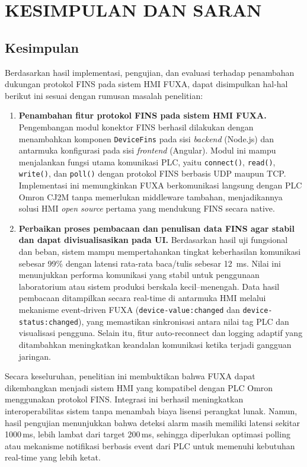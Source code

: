 \chapter{KESIMPULAN DAN SARAN}

\section{Kesimpulan}
Berdasarkan hasil implementasi, pengujian, dan evaluasi terhadap penambahan dukungan protokol FINS pada sistem HMI FUXA, dapat disimpulkan hal-hal berikut ini sesuai dengan rumusan masalah penelitian:

\begin{enumerate}
    \item \textbf{Penambahan fitur protokol FINS pada sistem HMI FUXA.}  
    Pengembangan modul konektor FINS berhasil dilakukan dengan menambahkan komponen \texttt{DeviceFins} pada sisi \textit{backend} (Node.js) dan antarmuka konfigurasi pada sisi \textit{frontend} (Angular).  
    Modul ini mampu menjalankan fungsi utama komunikasi PLC, yaitu \texttt{connect()}, \texttt{read()}, \texttt{write()}, dan \texttt{poll()} dengan protokol FINS berbasis UDP maupun TCP.  
    Implementasi ini memungkinkan FUXA berkomunikasi langsung dengan PLC Omron CJ2M tanpa memerlukan middleware tambahan, menjadikannya solusi HMI \textit{open source} pertama yang mendukung FINS secara native.

    \item \textbf{Perbaikan proses pembacaan dan penulisan data FINS agar stabil dan dapat divisualisasikan pada UI.}  
    Berdasarkan hasil uji fungsional dan beban, sistem mampu mempertahankan tingkat keberhasilan komunikasi sebesar 99\% dengan latensi rata-rata baca/tulis sebesar 12
    \,ms.  
    Nilai ini menunjukkan performa komunikasi yang stabil untuk penggunaan laboratorium atau sistem produksi berskala kecil–menengah.  
    Data hasil pembacaan ditampilkan secara real-time di antarmuka HMI melalui mekanisme event-driven FUXA (\texttt{device-value:changed} dan \texttt{device-status:changed}), yang memastikan sinkronisasi antara nilai tag PLC dan visualisasi pengguna.  
    Selain itu, fitur auto-reconnect dan logging adaptif yang ditambahkan meningkatkan keandalan komunikasi ketika terjadi gangguan jaringan.

\end{enumerate}

Secara keseluruhan, penelitian ini membuktikan bahwa FUXA dapat dikembangkan menjadi sistem HMI yang kompatibel dengan PLC Omron menggunakan protokol FINS.  
Integrasi ini berhasil meningkatkan interoperabilitas sistem tanpa menambah biaya lisensi perangkat lunak.  
Namun, hasil pengujian menunjukkan bahwa deteksi alarm masih memiliki latensi sekitar 1000\,ms, lebih lambat dari target 200\,ms, sehingga diperlukan optimasi polling atau mekanisme notifikasi berbasis event dari PLC untuk memenuhi kebutuhan real-time yang lebih ketat.

